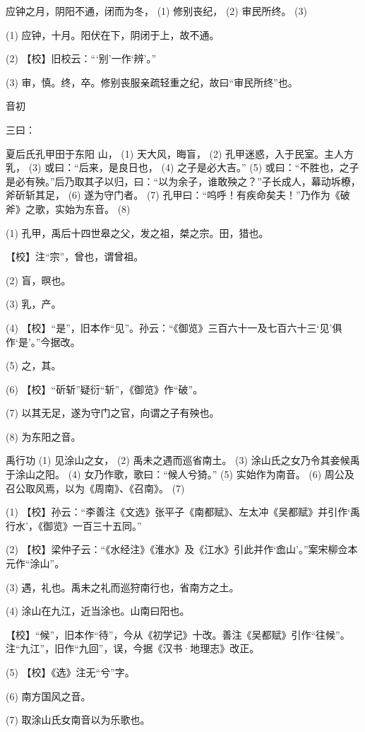 \documentclass[12pt,UTF8]{ctexbook}
\begin{document}
应钟之月，阴阳不通，闭而为冬， (1) 修别丧纪， (2) 审民所终。 (3)

(1) 应钟，十月。阳伏在下，阴闭于上，故不通。

(2) 【校】旧校云：“‘别’一作‘辨’。”

(3) 审，慎。终，卒。修别丧服亲疏轻重之纪，故曰“审民所终”也。





音初


三曰：

夏后氏孔甲田于东阳 山， (1) 天大风，晦盲， (2) 孔甲迷惑，入于民室。主人方乳， (3) 或曰：“后来，是良日也， (4) 之子是必大吉。” (5) 或曰：“不胜也，之子是必有殃。”后乃取其子以归，曰：“以为余子，谁敢殃之？”子长成人，幕动坼橑，斧斫斩其足， (6) 遂为守门者。 (7) 孔甲曰：“呜呼！有疾命矣夫！”乃作为《破斧》之歌，实始为东音。 (8)

(1) 孔甲，禹后十四世皋之父，发之祖，桀之宗。田，猎也。

【校】注“宗”，曾也，谓曾祖。

(2) 盲，暝也。

(3) 乳，产。

(4) 【校】“是”，旧本作“见”。孙云：“《御览》三百六十一及七百六十三‘见’俱作‘是’。”今据改。

(5) 之，其。

(6) 【校】“斫斩”疑衍“斩”，《御览》作“破”。

(7) 以其无足，遂为守门之官，向谓之子有殃也。

(8) 为东阳之音。

禹行功 (1) 见涂山之女， (2) 禹未之遇而巡省南土。 (3) 涂山氏之女乃令其妾候禹于涂山之阳。 (4) 女乃作歌，歌曰：“候人兮猗。” (5) 实始作为南音。 (6) 周公及召公取风焉，以为《周南》、《召南》。 (7)

(1) 【校】孙云：“李善注《文选》张平子《南都赋》、左太冲《吴都赋》并引作‘禹行水’，《御览》一百三十五同。”

(2) 【校】梁仲子云：“《水经注》《淮水》及《江水》引此并作‘嵞山’。”案宋柳佥本元作“涂山”。

(3) 遇，礼也。禹未之礼而巡狩南行也，省南方之土。

(4) 涂山在九江，近当涂也。山南曰阳也。

【校】“候”，旧本作“待”，今从《初学记》十改。善注《吴都赋》引作“往候”。注“九江”，旧作“九回”，误，今据《汉书·地理志》改正。

(5) 【校】《选》注无“兮”字。

(6) 南方国风之音。

(7) 取涂山氏女南音以为乐歌也。
\end{document}
